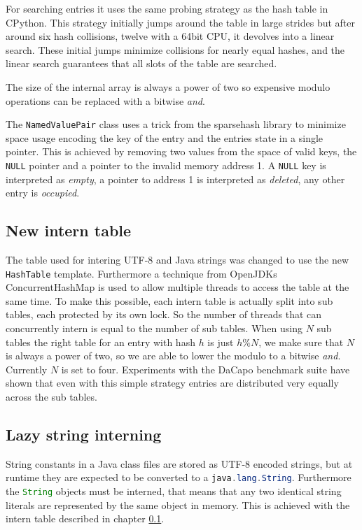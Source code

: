 \documentclass[12pt,a4paper,oneside]{article}
\newcommand{\cpp}[1]{\lstinline[language=C++]{#1}}
\newcommand{\java}[1]{\lstinline[language=Java]{#1}}
\begin{document}
	For searching entries it uses the same probing strategy as the hash table in CPython\cite{pydict}.
	This strategy initially jumps around the table in large strides but after around six hash collisions, twelve with a 64bit CPU,
	it devolves into a linear search.
	These initial jumps minimize collisions for nearly equal hashes, and the linear search guarantees that all slots of the table 
	are searched.

	The size of the internal array is always a power of two so expensive modulo operations can be replaced with a bitwise \emph{and}.

	The \cpp{NamedValuePair} class uses a trick from the sparsehash\cite{sparsehash} library to minimize space usage encoding
	the key of the entry and the entries state in a single pointer.
	This is achieved by removing two values from the space of valid keys, the \cpp{NULL} pointer and a pointer to the invalid
	memory address 1.
	A \cpp{NULL} key is interpreted as \emph{empty}, a pointer to address 1 is interpreted as \emph{deleted}, any other
	entry is \emph{occupied}.

\subsection{New intern table}
\label{intern_table}
	The table used for intering UTF-8 and Java strings was changed to use the new \cpp{HashTable} template.
	Furthermore a technique from OpenJDKs ConcurrentHashMap\cite{ConcurrentHashMap} is used to allow multiple threads
	to access the table at the same time.
	To make this possible, each intern table is actually split into sub tables, each protected by its own lock.
	So the number of threads that can concurrently intern is equal to the number of sub tables.
	When using $N$ sub tables the right table for an entry with hash $h$ is just $h\%N$, we make sure that $N$ is always a 
	power of two, so we are able to lower the modulo to a bitwise \emph{and}.
	Currently $N$ is set to four.
	Experiments with the DaCapo benchmark suite\cite{DaCapo} have shown that even with this simple strategy entries are distributed 
	very equally across the sub tables.

\subsection{Lazy string interning}
	String constants in a Java class files are stored as UTF-8 encoded strings, but at runtime they are expected to be converted to a 
	\java{java.lang.String}.
	Furthermore the \java{String} objects must be interned, that means that any two identical string literals are represented by
	the same object in memory.
	This is achieved with the intern table described in chapter \ref{intern_table}.
\end{document}
